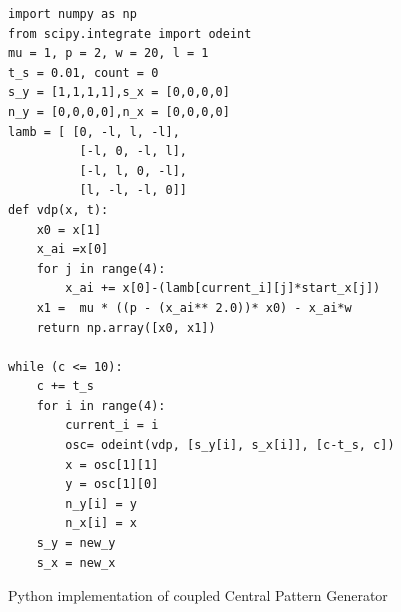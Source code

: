 \begin{figure}

\begin{lstlisting}[frame=single]
import numpy as np
from scipy.integrate import odeint
mu = 1, p = 2, w = 20, l = 1
t_s = 0.01, count = 0
s_y = [1,1,1,1],s_x = [0,0,0,0]
n_y = [0,0,0,0],n_x = [0,0,0,0]
lamb = [ [0, -l, l, -l],
          [-l, 0, -l, l],
          [-l, l, 0, -l],
          [l, -l, -l, 0]]
def vdp(x, t):
    x0 = x[1]
    x_ai =x[0]
    for j in range(4):
        x_ai += x[0]-(lamb[current_i][j]*start_x[j])
    x1 =  mu * ((p - (x_ai** 2.0))* x0) - x_ai*w
    return np.array([x0, x1])
    
while (c <= 10):
    c += t_s
    for i in range(4):
        current_i = i
        osc= odeint(vdp, [s_y[i], s_x[i]], [c-t_s, c])
        x = osc[1][1]
        y = osc[1][0]
        n_y[i] = y
        n_x[i] = x
    s_y = new_y
    s_x = new_x
\end{lstlisting}
\caption{Python implementation of coupled Central Pattern Generator }

\end{figure}

    
    


